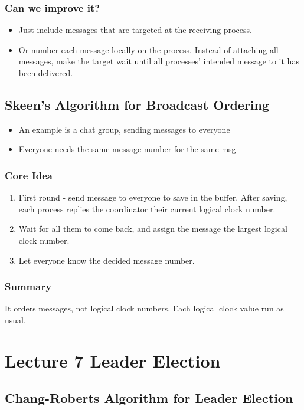 \documentclass[11pt]{article}
\begin{document}
\subsubsection{Can we improve it?}
\label{sec:org7ccdaa7}
\begin{itemize}
  \item Just include messages that are targeted at the receiving process.
  \item Or number each message locally on the process. Instead of attaching all
        messages, make the target wait until all processes' intended message to it has
        been delivered.
\end{itemize}
\subsection{Skeen's Algorithm for Broadcast Ordering}
\label{sec:orge4e7905}
\begin{itemize}
  \item An example is a chat group, sending messages to everyone
  \item Everyone needs the same message number for the same msg
\end{itemize}
\subsubsection{Core Idea}
\label{sec:org11c5dae}
\begin{enumerate}
  \item First round - send message to everyone to save in the buffer. After saving,
        each process replies the coordinator their current logical clock number.
  \item Wait for all them to come back, and assign the message the largest logical
        clock number.
  \item Let everyone know the decided message number.
\end{enumerate}
\subsubsection{Summary}
\label{sec:orgab337c5}
It orders messages, not logical clock numbers. Each logical clock value run as
usual.
\section{Lecture 7 Leader Election}
\label{sec:org808ec1e}
\subsection{Chang-Roberts Algorithm for Leader Election}
\label{sec:org0b3baae}
\end{document}
